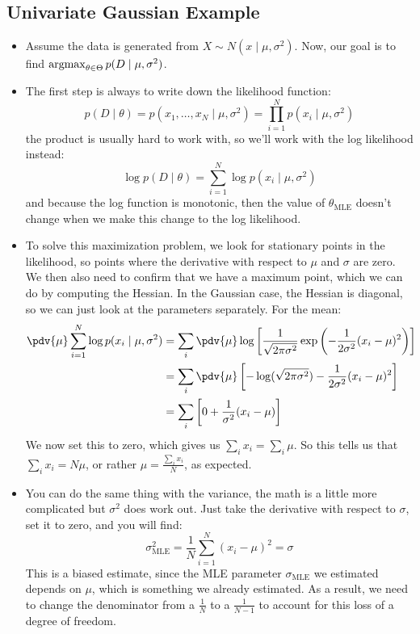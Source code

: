 \subsection{Univariate Gaussian Example}
\begin{itemize}
	\item Assume the data is generated from \( X \sim N(x \mid \mu, \sigma^2) \). 
		Now, our goal is to find \( \operatorname*{argmax}_{\theta \in \Theta}p(D \mid \mu,
		\sigma^2) \). 
	\item The first step is always to write down the likelihood function:
		\[
			p(D \mid \theta) = p(x_1, \dots, x_N \mid \mu, \sigma^2) = \prod_{i =
			1}^{N}p(x_i \mid \mu, \sigma^2)
		\]
		the product is usually hard to work with, so we'll work with the log
		likelihood instead: 
		\[
			\log p(D \mid \theta) = \sum_{i = 1}^{N}\log p(x_i \mid \mu, \sigma^2) 
		\]
		and because the log function is monotonic, then the value of \(
		\theta_\text{MLE} \) doesn't change when we make this change to the log
		likelihood. 
	\item To solve this maximization problem, we look for stationary points in the
		likelihood, so points where the derivative with respect to \( \mu \) and \(
		\sigma \) are zero. We then also need to confirm that we have a maximum
		point, which we can do by computing the Hessian. In the Gaussian case, the
		Hessian is diagonal, so we can just look at the parameters separately. For
		the mean:
		\begin{align*}
			\pdv{\mu} \sum_{i = 1}^{N}\log p(x_i \mid \mu, \sigma^2) &= \sum_{i}
			\pdv{\mu} \log \left[ \frac{1}{\sqrt{2\pi \sigma^2}}\exp\left(
			-\frac{1}{2\sigma^2}(x_i - \mu)^2 \right) \right] \\
			&= \sum_i \pdv{\mu} \left[-\log(\sqrt{2 \pi\sigma^2}) -
			\frac{1}{2\sigma^2}(x_i- \mu)^2\right] \\ 
			&= \sum_i \left[ 0 + \frac{1}{\sigma^2}(x_i - \mu) \right] 
		\end{align*}
		We now set this to zero, which gives us \( \sum_i x_i = \sum_i \mu \). So
		this tells us that \( \sum_i x_i = N \mu \), or rather \( \mu = \frac{\sum_i
		x_i}{N} \), as expected.
	\item You can do the same thing with the variance, the math is a little more
		complicated but \( \sigma^2 \) does work out. Just take the derivative with
		respect to \( \sigma \), set it to zero, and you will find:
		\[
			\sigma_\text{MLE}^2 = \frac{1}{N}\sum_{i = 1}^{N} (x_i - \mu)^2 = \sigma
		\]
		This is a biased estimate, since the MLE parameter \( \sigma_\text{MLE} \) we
		estimated depends on \( \mu \), which is something we already estimated. As a
		result, we need to change the denominator from a \( \frac{1}{N} \) to 
		a \( \frac{1}{N - 1} \) to account for this loss of a degree of freedom. 


\end{itemize}
